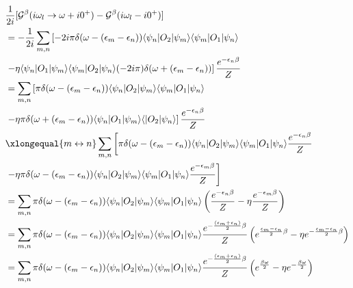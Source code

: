 \documentclass[a4paper,11pt]{article}
\begin{document}
\begin{equation*}
  \begin{split}
     &\frac{1}{2i}[\mathcal{G}^\beta(i\omega_l\rightarrow\omega+i0^+)-\mathcal{G}^\beta(i\omega_l-i0^+)]\\
       &=-\frac{1}{2i}\sum_{m,n}\left[-2i\pi\delta(\omega-(\epsilon_m-\epsilon_n))\langle\psi_n|O_2|\psi_m\rangle\langle\psi_m|O_1|\psi_n\rangle\right.\\
       &\left.-\eta\langle\psi_n|O_1|\psi_m\rangle\langle\psi_m|O_2|\psi_n\rangle(-2i\pi)\delta(\omega+(\epsilon_m-\epsilon_n))\right]\frac{e^{-\epsilon_n\beta}}{Z}\\
       &=\sum_{m,n}\left[\pi\delta(\omega-(\epsilon_m-\epsilon_n))\langle\psi_n|O_2|\psi_m\rangle\langle\psi_m|O_1|\psi_n\rangle\right.\\
       &\left.-\eta\pi\delta(\omega+(\epsilon_m-\epsilon_n))\langle\psi_n|O_1|\psi_m\rangle\langle|O_2|\psi_n\rangle\right]\frac{e^{-\epsilon_n\beta}}{Z}\\
       &\xlongequal{m\leftrightarrow n}\sum_{m,n}\left[\pi\delta(\omega-(\epsilon_m-\epsilon_n))\langle\psi_n|O_2|\psi_m\rangle\langle\psi_m|O_1|\psi_n\rangle\frac{e^{-\epsilon_n\beta}}{Z}\right.\\
       &\left.-\eta\pi\delta(\omega-(\epsilon_m-\epsilon_n))\langle\psi_n|O_2|\psi_m\rangle\langle\psi_m|O_1|\psi_n\rangle\frac{e^{-\epsilon_m\beta}}{Z}\right]\\
       &=\sum_{m,n}\pi\delta(\omega-(\epsilon_m-\epsilon_n))\langle\psi_n|O_2|\psi_m\rangle\langle\psi_m|O_1|\psi_n\rangle\left(\frac{e^{-\epsilon_n\beta}}{Z}-\eta\frac{e^{-\epsilon_m\beta}}{Z}\right)\\
       &=\sum_{m,n}\pi\delta(\omega-(\epsilon_m-\epsilon_n))\langle\psi_n|O_2|\psi_m\rangle\langle\psi_m|O_1|\psi_n\rangle\frac{e^{-\frac{(\epsilon_m+\epsilon_n)}{2}\beta}}{Z}\left(e^{\frac{\epsilon_m-\epsilon_n}{2}\beta}-\eta e^{-\frac{\epsilon_m-\epsilon_n}{2}\beta}\right)\\
       &=\sum_{m,n}\pi\delta(\omega-(\epsilon_m-\epsilon_n))\langle\psi_n|O_2|\psi_m\rangle\langle\psi_m|O_1|\psi_n\rangle\frac{e^{-\frac{(\epsilon_m+\epsilon_n)}{2}\beta}}{Z}\left(e^{\frac{\beta\omega}{2}}-\eta e^{-\frac{\beta\omega}{2}}\right)
  \end{split}
\end{equation*}
\end{document}

